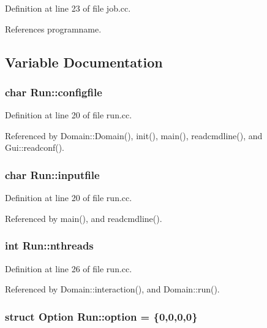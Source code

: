 Definition at line 23 of file job.cc.

References programname.

\subsection{Variable Documentation}
\hypertarget{namespaceRun_3a8e039898acf6eb150d36bfc1b799b6}{
\subsubsection[{configfile}]{\setlength{\rightskip}{0pt plus 5cm}char {\bf Run::configfile}}}
\label{namespaceRun_3a8e039898acf6eb150d36bfc1b799b6}




Definition at line 20 of file run.cc.

Referenced by Domain::Domain(), init(), main(), readcmdline(), and Gui::readconf().\hypertarget{namespaceRun_70e0ce554030dedb8ebc665cfb95167a}{
\subsubsection[{inputfile}]{\setlength{\rightskip}{0pt plus 5cm}char {\bf Run::inputfile}}}
\label{namespaceRun_70e0ce554030dedb8ebc665cfb95167a}




Definition at line 20 of file run.cc.

Referenced by main(), and readcmdline().\hypertarget{namespaceRun_b8a2ab3c70feb348697b53df22451f3c}{
\subsubsection[{nthreads}]{\setlength{\rightskip}{0pt plus 5cm}int {\bf Run::nthreads}}}
\label{namespaceRun_b8a2ab3c70feb348697b53df22451f3c}




Definition at line 26 of file run.cc.

Referenced by Domain::interaction(), and Domain::run().\hypertarget{namespaceRun_724100d30eed9a8f5ac9ec41e76e4c40}{
\subsubsection[{option}]{\setlength{\rightskip}{0pt plus 5cm}struct {\bf Option} {\bf Run::option} = \{0,0,0,0\}}}
\label{namespaceRun_724100d30eed9a8f5ac9ec41e76e4c40}


